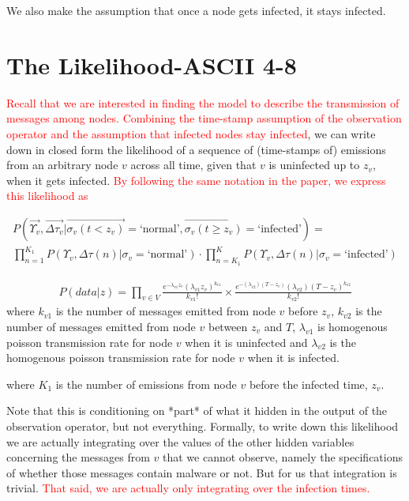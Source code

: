 \documentclass{article}
\begin{document}
	We also make the assumption that once a node gets infected, it
	stays infected.

\section{The Likelihood-ASCII 4-8}
	\textcolor{red}{Recall that we are interested in finding the model to describe
	the transmission of messages among nodes.
	Combining the time-stamp assumption of the observation operator and the assumption
	that infected nodes stay infected}, we can write down in closed form the likelihood
        of a sequence of (time-stamps of) emissions from an arbitrary node $v$ across all time, given that 
	$v$ is uninfected up to $z_{v}$, when it gets infected. \textcolor{red}{By following
	the same notation in the paper, we express this likelihood as}
        
	\begin{eqnarray*}
		P(\vec{\Upsilon_{v}}, \vec{\Delta\tau_{v}} | \vec{\sigma_{v}(t < z_{v})} = 
			\text{`normal'}, \vec{\sigma_{v}(t \geq z_{v})} = \text{`infected'})
		= \\
		\prod_{n = 1}^{K_{1}} P(\Upsilon_{v}, \Delta \tau (n) | \sigma_{v} = \text{`normal'})
			\cdot  
			\prod_{n = K_{1}}^{K} P(\Upsilon_{v}, \Delta \tau (n) | \sigma_{v} = \text{`infected'})
	\end{eqnarray*}
	
        \begin{align}
        P(data | z) = \prod_{v\in V}\frac{e^{-\lambda_{v1}z_v}(\lambda_{v1}z_v)^{k_{v1}}}{k_{v1}!}\times 
        \frac{e^{-(\lambda_{v2})(T-z_v)}(\lambda_{v2})(T-z_v)^{k_{v2}}}{k_{v2}!}
        \end{align}
        where $k_{v1}$ is the number of messages emitted from node $v$ before $z_v$, $k_{v2}$ 
        is the number of messages emitted from node $v$ between $z_v$ and $T$, $\lambda_{v1}$ is 
        homogenous poisson transmission rate for node $v$ when it is uninfected and $\lambda_{v2}$ is the 
        homogenous poisson transmission rate for node $v$ when it is infected.  
 
	where $K_{1}$ is the number of emissions from node $v$ before the infected time, $z_{v}$.

	Note that this is conditioning on *part* of what it hidden in the
	output of the observation operator, but not everything.  Formally, to
	write down this likelihood we are actually integrating over the values
	of the other hidden variables concerning the messages from $v$ that we
	cannot observe, namely the specifications of whether those messages
	contain malware or not. But for us that integration is trivial. 
	\textcolor{red}{That said, we are actually only integrating over the infection
	times.}
\end{document}
